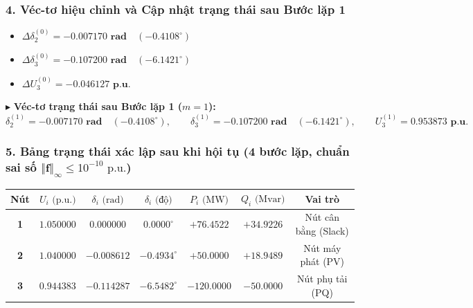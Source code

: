 \documentclass[10.5pt,a4paper]{article}
\begin{document}
\subsubsection*{4. Véc-tơ hiệu chỉnh và Cập nhật trạng thái sau Bước lặp 1}
\vspace{-4pt}
\begin{itemize}\setlength{\itemsep}{1pt}\setlength{\parskip}{0pt}
    \item $\Delta \delta_2^{(0)} = \mathbf{-0.007170\text{ rad}} \quad (-0.4108^\circ)$
    \item $\Delta \delta_3^{(0)} = \mathbf{-0.107200\text{ rad}} \quad (-6.1421^\circ)$
    \item $\Delta U_3^{(0)} = \mathbf{-0.046127\text{ p.u.}}$
\end{itemize}
$\blacktriangleright$ \textbf{Véc-tơ trạng thái sau Bước lặp 1 ($m=1$):}
$$\delta_2^{(1)} = \mathbf{-0.007170\text{ rad}} \quad (-0.4108^\circ), \qquad \delta_3^{(1)} = \mathbf{-0.107200\text{ rad}} \quad (-6.1421^\circ), \qquad U_3^{(1)} = \mathbf{0.953873\text{ p.u.}}$$

\vspace{-6pt}
\subsubsection*{5. Bảng trạng thái xác lập sau khi hội tụ (4 bước lặp, chuẩn sai số $\Vert \mathbf{f} \Vert_\infty \le 10^{-10}\text{ p.u.}$)}
\vspace{-4pt}
\begin{table}[H]
\centering
\small
\begin{tabular}{ccccccc}
\toprule
\textbf{Nút} & $U_i\text{ (p.u.)}$ & $\delta_i\text{ (rad)}$ & $\delta_i\text{ (độ)}$ & $P_i\text{ (MW)}$ & $Q_i\text{ (Mvar)}$ & \textbf{Vai trò} \\
\midrule
\textbf{1} & $1.050000$ & $0.000000$ & $0.0000^\circ$ & $+76.4522$ & $+34.9226$ & Nút cân bằng (Slack) \\
\textbf{2} & $1.040000$ & $-0.008612$ & $-0.4934^\circ$ & $+50.0000$ & $+18.9489$ & Nút máy phát (PV) \\
\textbf{3} & $0.944383$ & $-0.114287$ & $-6.5482^\circ$ & $-120.0000$ & $-50.0000$ & Nút phụ tải (PQ) \\
\bottomrule
\end{tabular}
\end{table}

\vspace{-6pt}
\end{document}

